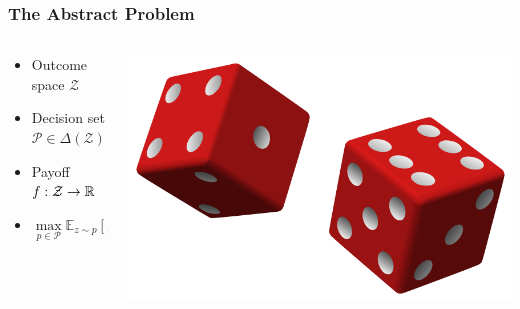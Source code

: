 \documentclass[aspectratio=169, table]{beamer}
\begin{document}
\begin{frame}
\frametitle{The Abstract Problem~\citep{chu2019probability}}
\begin{columns}
	\begin{column}{.65\textwidth}
		\begin{overlayarea}{\textwidth}{\textheight}
			\vspace{1cm}
			\begin{itemize}
			\setlength{\itemsep}{20pt}
			\item<1-> Outcome space $\mathcal{Z}$ 
			\item<2-> Decision set $\mathcal{P}\in\Delta(\mathcal{Z})$
			\item<3-> Payoff $f:\mathcal{Z}\to\mathbb{R}$
			\item<4-> $\max\limits_{p\in\mathcal{P}}\mathbb{E}_{z\sim p}\left[f(z)\right]$
		\end{itemize}
		\end{overlayarea}
	\end{column}
	\begin{column}{.35\textwidth}
		\begin{overlayarea}{\textwidth}{\textheight}
			\vspace{.2\textheight}
			\includegraphics[width=\textwidth]{dice.png}
		\end{overlayarea}
	\end{column}
\end{columns}
\end{frame}
\end{document}
